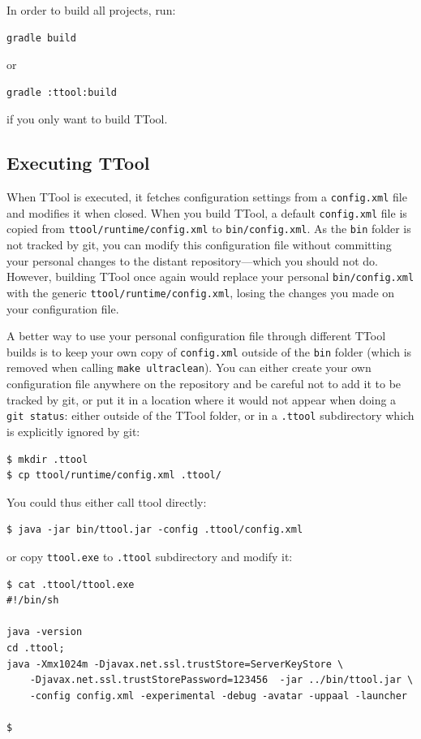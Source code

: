 \documentclass[12pt]{article}
\begin{document}
In order to build all projects, run:
\begin{verbatim}
gradle build
\end{verbatim}
or 
\begin{verbatim}
gradle :ttool:build
\end{verbatim}
if you only want to build TTool.

\subsection{Executing TTool}
When TTool is executed, it fetches configuration settings from a
\texttt{config.xml} file and modifies it when closed. When you build TTool, a
default \texttt{config.xml} file is copied from
\texttt{ttool/runtime/config.xml} to \texttt{bin/config.xml}. As the
\texttt{bin} folder is not tracked by git, you can modify this configuration
file without committing your personal changes to the distant repository---which
you should not do. However, building TTool once again would replace your
personal \texttt{bin/config.xml} with the generic
\texttt{ttool/runtime/config.xml}, losing the changes you made on your
configuration file.

A better way to use your personal configuration file through different TTool
builds is to keep your own copy of \texttt{config.xml} outside of the
\texttt{bin} folder (which is removed when calling \texttt{make ultraclean}).
You can either create your own configuration file anywhere on the repository and
be careful not to add it to be tracked by git, or put it in a location where it
would not appear when doing a \texttt{git status}: either outside of the TTool
folder, or in a \texttt{.ttool} subdirectory which is explicitly ignored by git:
\begin{verbatim}
$ mkdir .ttool
$ cp ttool/runtime/config.xml .ttool/
\end{verbatim}
You could thus either call ttool directly:
\begin{verbatim}
$ java -jar bin/ttool.jar -config .ttool/config.xml
\end{verbatim}
or copy \texttt{ttool.exe} to \texttt{.ttool} subdirectory and modify it:
\begin{verbatim}
$ cat .ttool/ttool.exe
#!/bin/sh

java -version
cd .ttool;
java -Xmx1024m -Djavax.net.ssl.trustStore=ServerKeyStore \
    -Djavax.net.ssl.trustStorePassword=123456  -jar ../bin/ttool.jar \
    -config config.xml -experimental -debug -avatar -uppaal -launcher

$
\end{verbatim}
\end{document}
